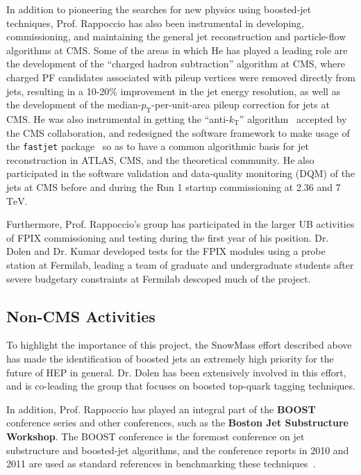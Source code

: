 \documentclass[12pt]{proposalnsf}
\newcommand{\TeV}{\ensuremath{\mathrm{TeV}}}
\begin{document}
In addition to pioneering the searches for new physics using
boosted-jet techniques, Prof. Rappoccio has also been instrumental in developing,
commissioning, and maintaining the general jet reconstruction and
particle-flow algorithms at CMS. Some of the areas in which
He has played a leading role are the development of the ``charged
hadron subtraction'' algorithm at CMS, where charged PF candidates
associated with pileup vertices were removed directly from
jets, resulting in a 10-20\% improvement in the jet energy
resolution, as well as the development of the
median-$p_\mathrm{T}$-per-unit-area pileup correction for jets at CMS. He was also
instrumental in getting the ``anti-$k_\mathrm{T}$'' algorithm~\cite{ktalg} accepted
by the CMS collaboration, and redesigned the software framework to
make usage of the {\tt fastjet} package~\cite{fastjet,fastjet1} so as to have a
common algorithmic basis for jet reconstruction in ATLAS, CMS, and the
theoretical community. He also
participated in the software validation and
data-quality monitoring (DQM) of the jets at CMS before and during the
Run 1 startup commissioning at 2.36 and 7 \TeV. 

Furthermore, Prof. Rappoccio's group has participated in the larger UB
activities of FPIX commissioning and testing during the first year of
his position. Dr. Dolen and Dr. Kumar developed tests for the FPIX
modules using a probe station at Fermilab, leading a team of graduate
and undergraduate students after severe budgetary constraints at
Fermilab descoped much of the project. 


\subsection{Non-CMS Activities}
To highlight the importance of this project, the SnowMass effort
described above has made the identification of boosted jets an
extremely high priority for the future of HEP in general. Dr. Dolen
has been extensively involved in this effort, and is co-leading the
group that focuses on boosted top-quark tagging techniques. 

In addition, Prof. Rappoccio has played an integral part of the {\bf BOOST}
conference series and other conferences, such as the {\bf Boston Jet
  Substructure Workshop}. The BOOST conference is the foremost
conference on jet substructure and boosted-jet algorithms, and the
conference reports in 2010 and 2011 are used as standard references in
benchmarking these techniques~\cite{boost2010,boost2011}.
\end{document}
